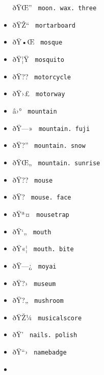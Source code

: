 \begin{itemize}
  \label{symbol-moon.wax.three}{{ ðŸŒ'' }
  \texttt{\ moon.\ wax.\ three\ }}
\item
  \label{symbol-mortarboard}{{ ðŸŽ`` }
  \texttt{\ mortarboard\ }}
\item
  \label{symbol-mosque}{{ ðŸ•Œ } \texttt{\ mosque\ }}
\item
  \label{symbol-mosquito}{{ ðŸ¦Ÿ } \texttt{\ mosquito\ }}
\item
  \label{symbol-motorcycle}{{ ðŸ?? }
  \texttt{\ motorcycle\ }}
\item
  \label{symbol-motorway}{{ ðŸ›£ } \texttt{\ motorway\ }}
\item
  \label{symbol-mountain}{{ â›° } \texttt{\ mountain\ }}
\item
  \label{symbol-mountain.fuji}{{ ðŸ---» }
  \texttt{\ mountain.\ fuji\ }}
\item
  \label{symbol-mountain.snow}{{ ðŸ?'' }
  \texttt{\ mountain.\ snow\ }}
\item
  \label{symbol-mountain.sunrise}{{ ðŸŒ„ }
  \texttt{\ mountain.\ sunrise\ }}
\item
  \label{symbol-mouse}{{ ðŸ?? } \texttt{\ mouse\ }}
\item
  \label{symbol-mouse.face}{{ ðŸ?­ }
  \texttt{\ mouse.\ face\ }}
\item
  \label{symbol-mousetrap}{{ ðŸª¤ }
  \texttt{\ mousetrap\ }}
\item
  \label{symbol-mouth}{{ ðŸ`„ } \texttt{\ mouth\ }}
\item
  \label{symbol-mouth.bite}{{ ðŸ«¦ }
  \texttt{\ mouth.\ bite\ }}
\item
  \label{symbol-moyai}{{ ðŸ---¿ } \texttt{\ moyai\ }}
\item
  \label{symbol-museum}{{ ðŸ?› } \texttt{\ museum\ }}
\item
  \label{symbol-mushroom}{{ ðŸ?„ } \texttt{\ mushroom\ }}
\item
  \label{symbol-musicalscore}{{ ðŸŽ¼ }
  \texttt{\ musicalscore\ }}
\item
  \label{symbol-nails.polish}{{ ðŸ' }
  \texttt{\ nails.\ polish\ }}
\item
  \label{symbol-namebadge}{{ ðŸ``› }
  \texttt{\ namebadge\ }}
\item

\end{itemize}
